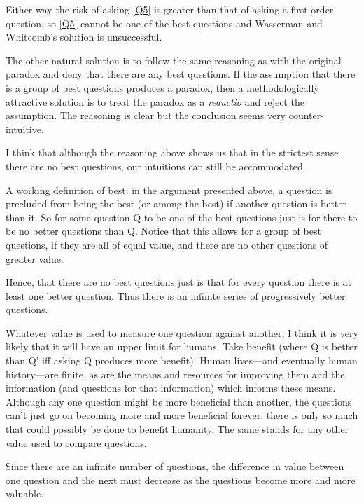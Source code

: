 Either way the risk of asking \ref{Q5} is greater than that of asking a first order question, so \ref{Q5} cannot be one of the best questions and Wasserman and Whitcomb's solution is unsuccessful.

The other natural solution is to follow the same reasoning as with the original paradox and deny that there are any best questions.
If the assumption that there is a group of best questions produces a paradox, then a methodologically attractive solution is to treat the paradox as a \textit{reductio} and reject the assumption.
The reasoning is clear but the conclusion seems very counter-intuitive.

I think that although the reasoning above shows us that in the strictest sense there are no best questions, our intuitions can still be accommodated.

A working definition of best: in the argument presented above, a question is precluded from being the best (or among the best) if another question is better than it.
So for some question Q to be one of the best questions just is for there to be no better questions than Q.
Notice that this allows for a group of best questions, if they are all of equal value, and there are no other questions of greater value.

Hence, that there are no best questions just is that for every question there is at least one better question.
Thus there is an infinite series of progressively better questions.

Whatever value is used to measure one question against another, I think it is very likely that it will have an upper limit for humans.
Take benefit (where Q is better than Q' iff asking Q produces more benefit).
Human lives---and eventually human history---are finite, as are the means and resources for improving them and the information (and questions for that information) which informs these means.
Although any one question might be more beneficial than another, the questions can't just go on becoming more and more beneficial forever: there is only so much that could possibly be done to benefit humanity.
The same stands for any other value used to compare questions.

Since there are an infinite number of questions, the difference in value between one question and the next must decrease as the questions become more and more valuable.

